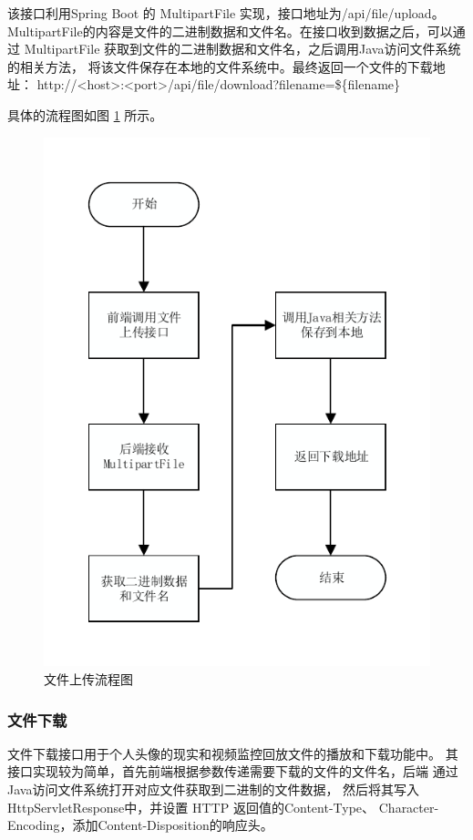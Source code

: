 该接口利用Spring Boot 的 MultipartFile 实现，接口地址为/api/file/upload。
MultipartFile的内容是文件的二进制数据和文件名。在接口收到数据之后，可以通过 
MultipartFile 获取到文件的二进制数据和文件名，之后调用Java访问文件系统的相关方法，
将该文件保存在本地的文件系统中。最终返回一个文件的下载地址：
http://<host>:<port>/api/file/download?filename=\$\{filename\}

具体的流程图如图 \ref{Fig:seq_upload} 所示。

\begin{figure}[ht]
    \centering
    \includegraphics[width=0.9\linewidth]{./Figure/IMG_seq_upload.pdf}
    \caption{文件上传流程图}\label{Fig:seq_upload}
\end{figure}

\subsubsection{文件下载}
文件下载接口用于个人头像的现实和视频监控回放文件的播放和下载功能中。
其接口实现较为简单，首先前端根据参数传递需要下载的文件的文件名，后端
通过Java访问文件系统打开对应文件获取到二进制的文件数据，
然后将其写入HttpServletResponse中，并设置 HTTP 返回值的Content-Type、
Character-Encoding，添加Content-Disposition的响应头。

